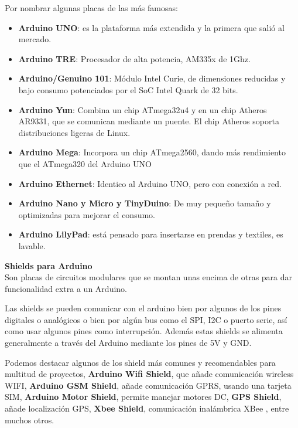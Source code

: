 Por nombrar algunas placas de las más famosas:
\begin{itemize}
	
\item \textbf{Arduino UNO}: es la plataforma más extendida y la primera que salió al mercado.

\item \textbf{Arduino TRE}: Procesador de alta potencia, AM335x de 1Ghz.

\item \textbf{Arduino/Genuino 101}: Módulo Intel Curie, de dimensiones reducidas y bajo consumo potenciados por el SoC Intel Quark de 32 bits.

\item \textbf{Arduino Yun}: Combina un chip ATmega32u4 y en un chip Atheros AR9331, que se comunican mediante un puente. El chip Atheros soporta distribuciones ligeras de Linux. 

\item \textbf{Arduino Mega}: Incorpora un chip ATmega2560, dando más rendimiento que el ATmega320 del Arduino UNO

\item \textbf{Arduino Ethernet}: Identico al Arduino UNO, pero con conexión a red.

\item \textbf{Arduino Nano y Micro y TinyDuino}: De muy pequeño tamaño y optimizadas para mejorar el consumo. 

\item \textbf{Arduino LilyPad}: está pensado para insertarse en prendas y textiles, es lavable. 

\end{itemize}


\textbf{Shields para Arduino} \\ 

Son placas de circuitos modulares que se montan unas encima de otras para dar funcionalidad extra a un Arduino.

\bigskip
Las shields se pueden comunicar con el arduino bien por algunos de los pines digitales o analógicos o bien por algún bus como el SPI, I2C o puerto serie, así como usar algunos pines como interrupción. Además estas shields se alimenta generalmente a través del Arduino mediante los pines de 5V y GND\cite{shield}.

\bigskip
Podemos destacar algunos de los shield más comunes y recomendables para multitud de proyectos, \textbf{Arduino Wifi Shield}, que añade comunicación wireless WIFI, \textbf{Arduino GSM Shield}, añade comunicación GPRS, usando una tarjeta SIM,
\textbf{Arduino Motor Shield}, permite manejar motores DC, \textbf{GPS Shield}, añade localización GPS, \textbf{Xbee Shield}, comunicación inalámbrica XBee \cite{XBee}, entre muchos otros. 


